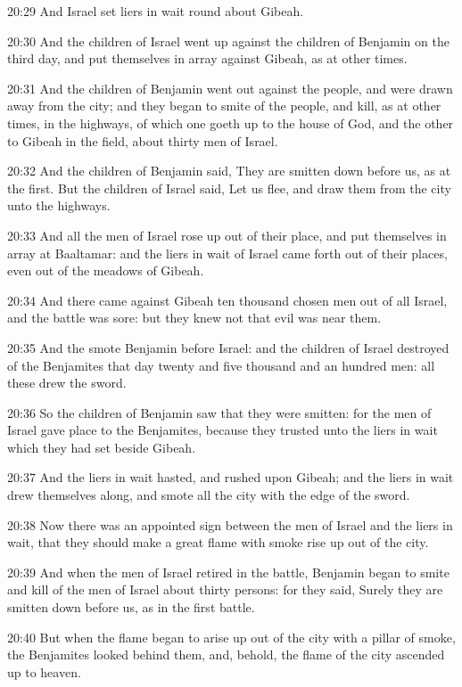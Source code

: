 20:29 And Israel set liers in wait round about Gibeah.

20:30 And the children of Israel went up against the children of Benjamin on the third day, and put themselves in array against Gibeah, as at other times.

20:31 And the children of Benjamin went out against the people, and were drawn away from the city; and they began to smite of the people, and kill, as at other times, in the highways, of which one goeth up to the house of God, and the other to Gibeah in the field, about thirty men of Israel.

20:32 And the children of Benjamin said, They are smitten down before us, as at the first. But the children of Israel said, Let us flee, and draw them from the city unto the highways.

20:33 And all the men of Israel rose up out of their place, and put themselves in array at Baaltamar: and the liers in wait of Israel came forth out of their places, even out of the meadows of Gibeah.

20:34 And there came against Gibeah ten thousand chosen men out of all Israel, and the battle was sore: but they knew not that evil was near them.

20:35 And the \LORD smote Benjamin before Israel: and the children of Israel destroyed of the Benjamites that day twenty and five thousand and an hundred men: all these drew the sword.

20:36 So the children of Benjamin saw that they were smitten: for the men of Israel gave place to the Benjamites, because they trusted unto the liers in wait which they had set beside Gibeah.

20:37 And the liers in wait hasted, and rushed upon Gibeah; and the liers in wait drew themselves along, and smote all the city with the edge of the sword.

20:38 Now there was an appointed sign between the men of Israel and the liers in wait, that they should make a great flame with smoke rise up out of the city.

20:39 And when the men of Israel retired in the battle, Benjamin began to smite and kill of the men of Israel about thirty persons: for they said, Surely they are smitten down before us, as in the first battle.

20:40 But when the flame began to arise up out of the city with a pillar of smoke, the Benjamites looked behind them, and, behold, the flame of the city ascended up to heaven.

